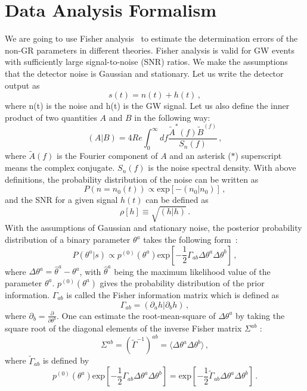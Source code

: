 \documentclass[prd,twocolumn,nofootinbib]{revtex4-1}
\newcommand\be{\begin{equation}}
\newcommand\ee{\end{equation}}
\begin{document}
\section{Data Analysis Formalism}
We are going to use Fisher analysis~\cite{Cutler:1994ys} to estimate the determination errors of the non-GR parameters in different theories. Fisher analysis is valid for GW events with sufficiently large signal-to-noise (SNR) ratios. We make the assumptions that the detector noise is Gaussian and stationary. Let us write the detector output as
\be
s(t)=n(t)+h(t)\,,
\ee
where n(t) is the noise and h(t) is the GW signal. Let us also define the inner product of two quantities $A$ and $B$ in the following way:
 \be
 \left(A|B\right)=4Re\int_0^\infty df \frac{\tilde{A}^*(f)\tilde{B}^(f)}{S_n \left( f \right)}\,,
 \ee
where $\tilde{A}(f)$ is the Fourier component of $A$ and an asterisk ($*$) superscript means the complex conjugate. $S_n\left(f\right)$ is the noise spectral density. With above definitions, the probability distribution of the noise can be written as
 \be
P\left(n=n_0(t)\right) \propto \text{exp}\left[-\left(n_0|n_0\right)\right]\,,
\ee
and the SNR for a given signal $h(t)$ can be defined as 
\be
\rho\left[h\right]\equiv\sqrt{\left(h|h\right)}\,.
\ee
With the assumptions of Gaussian and stationary noise, the posterior probability distribution of a binary parameter $\theta^a$ takes the following form~:
\be
P\left(\theta^a|s\right) \propto p^{(0)}\left(\theta^a\right) \text{exp}\left[-\frac{1}{2} \Gamma_{ab} \Delta\theta^a\Delta \theta^b \right]\,,
\ee
where $\Delta \theta^a=\hat{\theta}^a-\theta^a$, with $\hat{\theta}^a$ being the maximum likelihood value of the parameter $\theta^a$. $p^{(0)}\left(\theta^a\right)$ gives the probability distribution of the prior information. $\Gamma_{ab}$ is called the Fisher information matrix which is defined as
\be
\Gamma_{ab}=\left(\partial_a h|\partial_b h \right)\,,
\ee
where $\partial_b=\frac{\partial}{\partial \theta^b}$. One can estimate the root-mean-square of $\Delta \theta^a$ by taking the square root of the diagonal elements of the inverse Fisher matrix $\Sigma^{ab}$ : 
\be
\Sigma^{ab}=\left(\tilde{\Gamma}^{-1}\right)^{ab}=\langle\Delta\theta^a\Delta \theta^b\rangle\,,
\ee
where $\tilde{\Gamma}_{ab}$ is defined by
\be
p^{(0)}\left(\theta^a\right) \text{exp}\left[-\frac{1}{2} \Gamma_{ab} \Delta\theta^a\Delta \theta^b \right]=\text{exp}\left[-\frac{1}{2} \tilde{\Gamma}_{ab} \Delta\theta^a\Delta \theta^b \right]\,.
\ee
\end{document}

